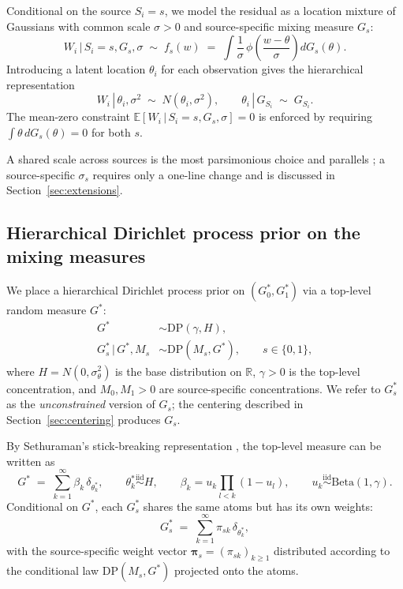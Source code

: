 \documentclass[11pt]{article}
\newcommand{\given}{\,|\,}
\newcommand{\E}{\mathbb{E}}
\newcommand{\1}{\mathbf{1}}
\newcommand{\R}{\mathbb{R}}
\begin{document}
Conditional on the source $S_i = s$, we model the residual as a location mixture of Gaussians with common scale $\sigma > 0$ and source-specific mixing measure $G_s$:
\begin{equation}
W_i \given S_i = s, G_s, \sigma \;\sim\; f_s(w) \;=\; \int \frac{1}{\sigma}\, \phi\!\left(\frac{w - \theta}{\sigma}\right) dG_s(\theta).
\label{eq:fs}
\end{equation}
Introducing a latent location $\theta_i$ for each observation gives the hierarchical representation
\begin{equation}
W_i \given \theta_i, \sigma^2 \;\sim\; N(\theta_i, \sigma^2), \qquad \theta_i \given G_{S_i} \;\sim\; G_{S_i}.
\label{eq:hierarchical-w}
\end{equation}
The mean-zero constraint $\E[W_i \given S_i = s, G_s, \sigma] = 0$ is enforced by requiring $\int \theta\, dG_s(\theta) = 0$ for both $s$.

A shared scale across sources is the most parsimonious choice and parallels \citet{henderson2020individualized}; a source-specific $\sigma_s$ requires only a one-line change and is discussed in Section~\ref{sec:extensions}.

\subsection{Hierarchical Dirichlet process prior on the mixing measures}

We place a hierarchical Dirichlet process prior \citep{teh2006hierarchical} on $(G_0^*, G_1^*)$ via a top-level random measure $G^*$:
\begin{align}
G^* &\sim \mathrm{DP}(\gamma, H), \\
G_s^* \given G^*, M_s &\sim \mathrm{DP}(M_s, G^*), \qquad s \in \{0, 1\},
\end{align}
where $H = N(0, \sigma_\theta^2)$ is the base distribution on $\R$, $\gamma > 0$ is the top-level concentration, and $M_0, M_1 > 0$ are source-specific concentrations. We refer to $G_s^*$ as the \emph{unconstrained} version of $G_s$; the centering described in Section~\ref{sec:centering} produces $G_s$.

By Sethuraman's stick-breaking representation \citep{sethuraman1994constructive}, the top-level measure can be written as
\begin{equation}
G^* \;=\; \sum_{k=1}^\infty \beta_k\, \delta_{\theta_k^*}, \qquad
\theta_k^* \stackrel{\mathrm{iid}}{\sim} H, \qquad
\beta_k = u_k \prod_{l < k}(1 - u_l), \qquad
u_k \stackrel{\mathrm{iid}}{\sim} \mathrm{Beta}(1, \gamma).
\end{equation}
Conditional on $G^*$, each $G_s^*$ shares the same atoms but has its own weights:
\begin{equation}
G_s^* \;=\; \sum_{k=1}^\infty \pi_{sk}\, \delta_{\theta_k^*},
\end{equation}
with the source-specific weight vector $\bm{\pi}_s = (\pi_{sk})_{k \ge 1}$ distributed according to the conditional law $\mathrm{DP}(M_s, G^*)$ projected onto the atoms.
\end{document}
